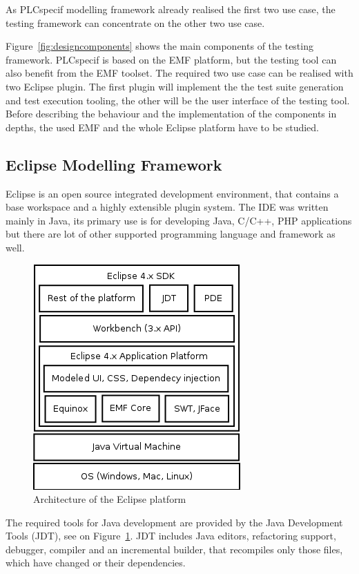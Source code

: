 As PLCspecif modelling framework already realised the first two use case, the testing framework can concentrate on the other two use case.

Figure~\ref{fig:designcomponents} shows the main components of the testing framework. PLCspecif is based on the EMF platform, but the testing tool can also benefit from the EMF toolset. The required two use case can be realised with two Eclipse plugin. The first plugin will implement the the test suite generation and test execution tooling, the other will be the user interface of the testing tool. Before describing the behaviour and the implementation of the components in depths, the used EMF and the whole Eclipse platform have to be studied.

\subsection{Eclipse Modelling Framework}
\label{sub:emf}

Eclipse is an open source integrated development environment, that contains a base workspace and a highly extensible plugin system. The IDE was written mainly in Java, its primary use is for developing Java, C/C++, PHP applications but there are lot of other supported programming language and framework as well.

\begin{figure}[htp]
\centering
\includegraphics[scale=0.5]{figures/design_eclipse.png}
\caption{Architecture of the Eclipse platform}
\label{fig:designeclipse}
\end{figure}

The required tools for Java development are provided by the Java Development Tools (JDT), see on Figure~\ref{fig:designeclipse}. JDT includes Java editors, refactoring support, debugger, compiler and an incremental builder, that recompiles only those files, which have changed or their dependencies.


